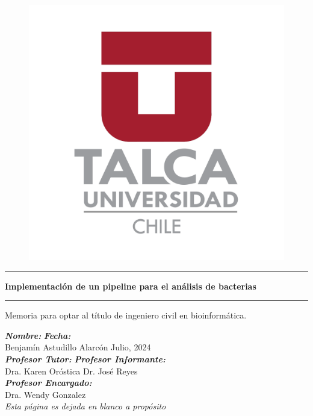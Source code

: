 \documentclass[12pt]{article}
\begin{document}
\begin{figure}[!ht]
    \vspace{-5mm}
    \centering
        \includegraphics[scale=0.14]{logo.png}
\end{figure}

\begin{center}
\begin{LARGE}
    \rule{14cm}{0.5mm}
    \textbf{Implementación de un pipeline para el análisis de bacterias} \\
    \vspace{1mm} %
    \rule{14cm}{0.5mm}
    \vspace{1cm}
\end{LARGE}
\end{center}
\begin{center}
    \begin{large}
        Memoria para optar al título de ingeniero civil en bioinformática.
    \end{large}
\end{center}
\vfill %
\thispagestyle{empty} %
\noindent %
\emph{\textbf{Nombre:}} \hfill \emph{\textbf{Fecha:}} \\ %
Benjamín Astudillo Alarcón \hfill Julio, 2024\\
\emph{\textbf{Profesor Tutor:}} \hfill \emph{\textbf{Profesor Informante:}} \\
Dra. Karen Oróstica \hfill  Dr. José Reyes\\
\emph{\textbf{Profesor Encargado:}}\\
Dra. Wendy Gonzalez \\
\newpage
\emph{Esta página es dejada en blanco a propósito}
\end{document}

